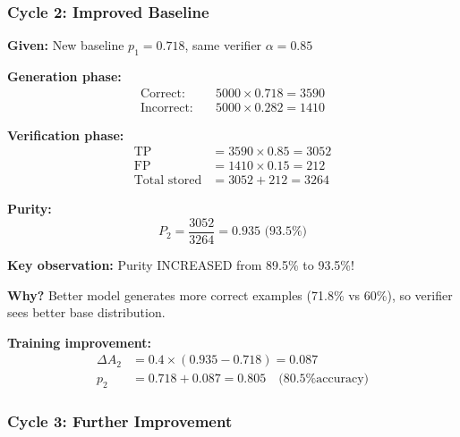 \documentclass[12pt,a4paper]{article}
\theoremstyle{definition}
\begin{document}
\subsubsection{Cycle 2: Improved Baseline}

\begin{examplebox}[title=Cycle 2 Detailed Calculation]

\textbf{Given:} New baseline $p_1 = 0.718$, same verifier $\alpha = 0.85$

\textbf{Generation phase:}
\begin{align}
\text{Correct:} \quad & 5000 \times 0.718 = 3590 \\
\text{Incorrect:} \quad & 5000 \times 0.282 = 1410
\end{align}

\textbf{Verification phase:}
\begin{align}
\text{TP} &= 3590 \times 0.85 = 3052 \\
\text{FP} &= 1410 \times 0.15 = 212 \\
\text{Total stored} &= 3052 + 212 = 3264
\end{align}

\textbf{Purity:}
\begin{equation}
P_2 = \frac{3052}{3264} = 0.935 \text{ (93.5\%)}
\end{equation}

\textbf{Key observation:} Purity INCREASED from 89.5\% to 93.5\%!

\textbf{Why?} Better model generates more correct examples (71.8\% vs 60\%), so verifier sees better base distribution.

\textbf{Training improvement:}
\begin{align}
\Delta A_2 &= 0.4 \times (0.935 - 0.718) = 0.087 \\
p_2 &= 0.718 + 0.087 = 0.805 \quad \text{(80.5\% accuracy)}
\end{align}
\end{examplebox}

\subsubsection{Cycle 3: Further Improvement}
\end{document}
